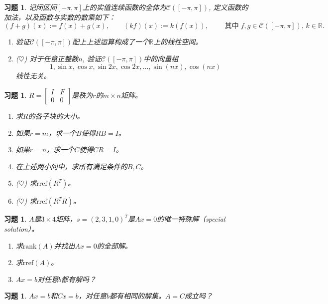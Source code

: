 \documentclass[UTF8]{ctexart}
\newcommand{\rref}{\mathrm{rref}}
\newcommand{\rank}{{\mathrm{rank}}}
\newtheorem{ex}[thm]{习题}
\begin{document}
\begin{ex}
记闭区间$[-\pi,\pi]$上的实值连续函数的全体为$\mathcal{C}([-\pi,\pi])$, 定义函数的加法，以及函数与实数的数乘如下：
\begin{equation*}
(f+g)(x) := f(x) + g(x), \qquad (kf)(x) := k(f(x)), \qquad \text{ 其中}\; f,g \in \mathcal{C}([-\pi,\pi]), \, k \in \mathbb{R}.
\end{equation*}
\begin{enumerate}
\item 验证$\mathcal{C}([-\pi,\pi])$配上上述运算构成了一个$\mathbb{R}$上的线性空间。
\item {($\heartsuit  $)} 对于任意正整数$n$, 验证$\mathcal{C}([-\pi,\pi])$中的向量组
\begin{equation*}
1, \sin x, \cos x, \sin 2x, \cos 2x, \dots, \sin (nx), \cos (nx)
\end{equation*}
线性无关。
\end{enumerate}
\end{ex}



\begin{ex}
		$R=\begin{bmatrix}
		I & F\\ 0&0
	\end{bmatrix}$是秩为$r$的$m\times n$矩阵。
	\begin{enumerate}
		\item 求$R$的各子块的大小。
			\item 如果$r=m$，求一个$B$使得$RB=I$。
			\item 如果$r=n$，求一个$C$使得$CR=I$。
			\item 在上述两小问中，求所有满足条件的$B,C$。
		\item {($\heartsuit  $)} 求$\rref(R^T)$。
		\item {($\heartsuit  $)} 求$\rref(R^TR)$。
	\end{enumerate}
\end{ex}


\begin{ex}
		$A$是$3\times 4$矩阵，$s=(2,3,1,0)^T$是$Ax=0$的唯一特殊解（special solution）。
	\begin{enumerate}
		\item 求$\rank(A)$并找出$Ax=0$的全部解。
		\item 求$\rref(A)$。
			\item $Ax=b$对任意$b$都有解吗？
	\end{enumerate}
\end{ex}
\begin{ex}
		$Ax=b$和$Cx=b$，对任意$b$都有相同的解集。$A=C$成立吗？
\end{ex}
\end{document}
